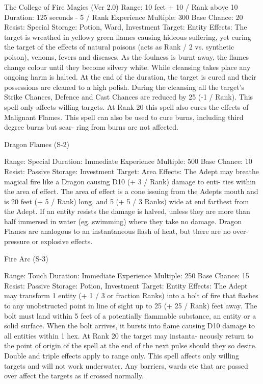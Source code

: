 \begin{Chapter}{The College of Fire Magics (Ver 2.0)}
Range: 10 feet + 10 / Rank above 10 
Duration: 125 seconds - 5 / Rank 
Experience Multiple: 300 
Base Chance: 20%
Resist: Special 
Storage: Potion, Ward, Investment 
Target: Entity 
Effects:  The  target  is  wreathed  in  yellowy  green 
flames  causing  hideous  suffering,  yet  curing  the 
target  of  the  effects  of  natural  poisons  (acts  as 
Rank / 2 vs. synthetic poison), venoms, fevers and 
diseases. As the foulness is burnt away, the flames 
change  colour  until  they  become  silvery  white. 
While  cleansing  takes  place  any  ongoing  harm  is 
halted.  At  the  end  of  the  duration,  the  target  is 
cured  and  their  possessions  are  cleaned  to  a  high 
polish.  During  the  cleansing  all  the  target’s  Strike 
Chances,  Defence  and  Cast  Chances  are  reduced 
by  25  (-1  /  Rank).  This  spell  only  affects  willing 
targets. At Rank 20 this spell also cures the effects 
of Malignant Flames. This spell can also be used to 
cure  burns,  including  third  degree  burns  but  scar-
ring from burns are not affected. 

Dragon Flames (S-2) 

Range: Special 
Duration: Immediate 
Experience Multiple: 500 
Base Chance: 10%
Resist: Passive 
Storage: Investment 
Target: Area 
Effects: The Adept may breathe magical fire like a 
Dragon  causing  D10  (+ 3 / Rank)  damage  to  enti-
ties within the area of effect. The area of effect is a 
cone issuing from the Adepts mouth and is 20 feet 
(+  5  /  Rank)  long,  and  5  (+  5  /  3  Ranks)  wide  at 
end farthest from the Adept. If an entity resists the 
damage  is  halved,  unless  they  are  more  than  half 
immersed in water (eg. swimming) where they take 
no  damage.  Dragon  Flames  are  analogous  to  an 
instantaneous  flash  of  heat,  but  there  are  no  over-
pressure or explosive effects. 

Fire Arc (S-3) 

Range: Touch 
Duration: Immediate 
Experience Multiple: 250 
Base Chance: 15%
Resist: Passive 
Storage: Potion, Investment 
Target: Entity 
Effects: The Adept may transform 1 entity (+ 1 / 3 
or fraction Ranks) into a bolt of fire that flashes to 
any unobstructed point in line of sight up to 25 (+ 
25 / Rank) feet away. The bolt must land within 5 
feet of a potentially flammable substance, an entity 
or  a  solid  surface.  When  the  bolt  arrives,  it  bursts 
into  flame  causing  D10  damage  to  all  entities 
within  1  hex.  At  Rank  20  the  target  may  instanta-
neously return to the point of origin of the  spell at 
the  end  of  the  next  pulse  should  they  so  desire. 
Double and triple effects apply to range only. This 
spell affects only willing targets and will not work 
underwater. Any barriers, wards etc that are passed 
over affect the targets as if crossed normally. 


\end{Chapter}
